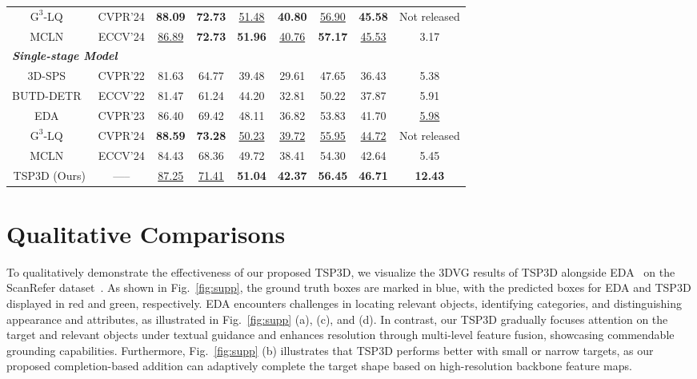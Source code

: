 \begin{table*}[h]
{\begin{tabular}{@{}ccccccccc@{}}
\(\text{G}^3\)-LQ~\citep{wang2024g} & CVPR'24 & \textbf{88.09}& \textbf{72.73}& \underline{51.48}& \textbf{40.80}& \underline{56.90} & \textbf{45.58} & Not released \\
MCLN~\citep{qian2025multi} & ECCV'24 & \underline{86.89} &\textbf{72.73} &\textbf{51.96} &\underline{40.76} & \textbf{57.17} & \underline{45.53} & 3.17 \\
\midrule
\multicolumn{9}{l}{\textbf{\textit{Single-stage Model} }} \\
\midrule
3D-SPS~\citep{luo20223d} & CVPR'22 & 81.63 &64.77 &39.48 &29.61 & 47.65 & 36.43 & 5.38 \\
BUTD-DETR~\citep{jain2022bottom} & ECCV'22 & 81.47 &61.24 &44.20 &32.81 & 50.22 & 37.87 & 5.91 \\
EDA~\citep{wu2023eda} & CVPR'23 & 86.40& 69.42& 48.11 &36.82& 53.83 & 41.70 & \underline{5.98} \\
\(\text{G}^3\)-LQ~\citep{wang2024g} & CVPR'24 &\textbf{88.59}& \textbf{73.28}& \underline{50.23} & \underline{39.72} & \underline{55.95} & \underline{44.72} & Not released \\
MCLN~\citep{qian2025multi} & ECCV'24 & 84.43 & 68.36 &49.72 &38.41 & 54.30 & 42.64 & 5.45 \\
TSP3D (Ours) & ----- & \underline{87.25} & \underline{71.41}& \textbf{51.04} &\textbf{42.37}  & \textbf{56.45} & \textbf{46.71} & \textbf{12.43} \\
\bottomrule
\end{tabular}
}
\end{table*}



\section{Qualitative Comparisons}\label{sec:supp4}
To qualitatively demonstrate the effectiveness of our proposed TSP3D, we visualize the 3DVG results of TSP3D alongside EDA~\citep{wu2023eda} on the ScanRefer dataset~\citep{chen2020scanrefer}. As shown in Fig.~\ref{fig:supp}, the ground truth boxes are marked in blue, with the predicted boxes for EDA and TSP3D displayed in red and green, respectively. EDA encounters challenges in locating relevant objects, identifying categories, and distinguishing appearance and attributes, as illustrated in Fig.~\ref{fig:supp} (a), (c), and (d). In contrast, our TSP3D gradually focuses attention on the target and relevant objects under textual guidance and enhances resolution through multi-level feature fusion, showcasing commendable grounding capabilities. Furthermore, Fig.~\ref{fig:supp} (b) illustrates that TSP3D performs better with small or narrow targets, as our proposed completion-based addition can adaptively complete the target shape based on high-resolution backbone feature maps.

